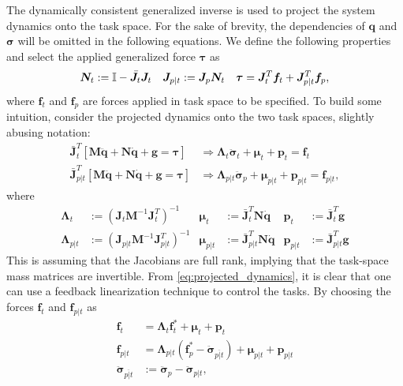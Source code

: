 The dynamically consistent generalized inverse is used to project the system dynamics
onto the task space. For the sake of brevity, the dependencies of $\bm{q}$ and $\bm{\sigma}$
will be omitted in the following equations. We define the following properties and
select the applied generalized force $\bm{\tau}$ as
\begin{align}
    \bm{N}_t &:= \mathbb{I} - \bar{\bm{J}}_t \bm{J}_t &
    \bm{J}_{p|t} &:= \bm{J}_p \bm{N}_t &
    \bm{\tau} = \bm{J}_t^T \bm{f}_t + \bm{J}_{p|t}^T \bm{f}_p,
    \label{eq:force_application}
\end{align}
where $\bm{f}_t$ and $\bm{f}_p$ are forces applied in task space to be
specified. To build some intuition, consider the projected dynamics onto
the two task spaces, slightly abusing notation:
\begin{subequations}
    \label{eq:projected_dynamics}
\begin{align}
    \bar{\bm{J}}_t^T \left[
        \bm{M} \ddot{\bm{q}} + \bm{N} \dot{\bm{q}} + \bm{g} = \bm{\tau}
        \right]
    &\Rightarrow
    \bm{\Lambda}_t \ddot{\bm{\sigma}}_t + \bm{\mu}_t + \bm{p}_t = \bm{f}_t \\
    \bar{\bm{J}}_{p|t}^T \left[
        \bm{M} \ddot{\bm{q}} + \bm{N} \dot{\bm{q}} + \bm{g} = \bm{\tau}
        \right]
    &\Rightarrow
    \bm{\Lambda}_{p|t} \ddot{\bm{\sigma}}_p + \bm{\mu}_{p|t} + \bm{p}_{p|t} = \bm{f}_{p|t},
\end{align}
\end{subequations}
where
\begin{subequations}
\begin{align}
    \bm{\Lambda}_t &:= \left(\bm{J}_t \bm{M}^{-1} \bm{J}_t^T\right)^{-1} &
    \bm{\mu}_t &:= \bar{\bm{J}}_t^T \bm{N} \dot{\bm{q}} &
    \bm{p}_t &:= \bar{\bm{J}}_t^T \bm{g} \\
    \bm{\Lambda}_{p|t} &:= \left(\bm{J}_{p|t} \bm{M}^{-1} \bm{J}_{p|t}^T\right)^{-1} \label{eq:lambda_pIt} &
    \bm{\mu}_{p|t} &:= \bar{\bm{J}}_{p|t}^T \bm{N} \dot{\bm{q}} &
    \bm{p}_{p|t} &:= \bar{\bm{J}}_{p|t}^T \bm{g}
\end{align}
\end{subequations}
This is assuming that the Jacobians are full rank, implying that the task-space
mass matrices are invertible. From \autoref{eq:projected_dynamics}, it is clear
that one can use a feedback linearization technique to control the tasks. By
choosing the forces $\bm{f}_t$ and $\bm{f}_{p|t}$ as
\begin{subequations}
\begin{align}
    \bm{f}_t &= \bm{\Lambda}_t \bm{f}_t^* + \bm{\mu}_t + \bm{p}_t \\
    \bm{f}_{p|t} &= \bm{\Lambda}_{p|t} \left(\bm{f}_p^* - \ddot{\bm{\sigma}}_{\overline{p|t}}\right) + \bm{\mu}_{p|t} + \bm{p}_{p|t} \label{eq:osc_fp|t}\\
    \ddot{\bm{\sigma}}_{\overline{p|t}} &:= \ddot{\bm{\sigma}}_p - \ddot{\bm{\sigma}}_{p|t},
\end{align}
\end{subequations}
